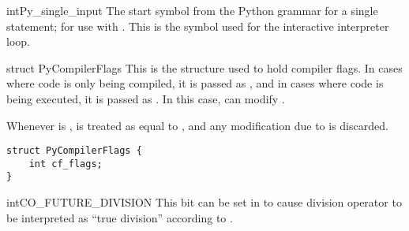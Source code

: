 \begin{cvardesc}{int}{Py_single_input}
  The start symbol from the Python grammar for a single statement; for
  use with .
  This is the symbol used for the interactive interpreter loop.
\end{cvardesc}

\begin{ctypedesc}[PyCompilerFlags]{struct PyCompilerFlags}
  This is the structure used to hold compiler flags.  In cases where
  code is only being compiled, it is passed as , and in
  cases where code is being executed, it is passed as
  .  In this case,  can modify .

  Whenever  is \NULL, 
  is treated as equal to , and any modification due to
   is discarded.
\begin{verbatim}
struct PyCompilerFlags {
    int cf_flags;
}
\end{verbatim}
\end{ctypedesc}

\begin{cvardesc}{int}{CO_FUTURE_DIVISION}
  This bit can be set in  to cause division operator \code{/}
  to be interpreted as ``true division'' according to .
\end{cvardesc}
